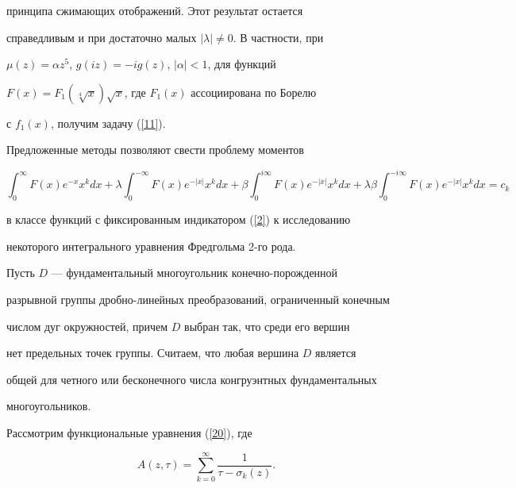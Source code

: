 принципа сжимающих отображений. Этот результат остается


справедливым и при достаточно малых $|\lambda|\ne0$. В частности, при


$\mu(z)=\alpha z^5$, $g(iz)=-ig(z)$, $|\alpha|<1$, для функций


$F(x)=F_1(\sqrt[4]x)\sqrt{x}$, где $F_1(x)$ ассоциирована по Борелю


с $f_1(x)$, получим задачу (\ref{11}).





\begin{note}


Предложенные методы позволяют свести проблему моментов


$$


\int_0^\infty F(x)e^{-x}x^k dx


+\lambda\int_0^{-\infty}F(x)e^{-|x|}x^k dx+


\beta\int_0^{i\infty} F(x)e^{-|x|}x^k dx+


\lambda\beta\int_0^{-i\infty} F(x)e^{-|x|}x^k dx=c_k


$$


в классе функций с фиксированным индикатором (\ref{2}) к исследованию


некоторого интегрального уравнения Фредгольма 2-го рода.


\end{note}





Пусть $D$ --- фундаментальный многоугольник конечно-порожденной


разрывной группы дробно-линейных преобразований, ограниченный конечным


числом дуг окружностей, причем $D$ выбран так, что среди его вершин


нет предельных точек группы. Считаем, что любая вершина $D$ является


общей для четного или бесконечного числа конгруэнтных фундаментальных 


многоугольников.


Рассмотрим функциональные уравнения (\ref{20}), где


\begin{equation}\label{22}


A(z,\tau)=\sum^\infty_{k=0}\frac{1}{\tau-\sigma_k(z)}.


\end{equation}


